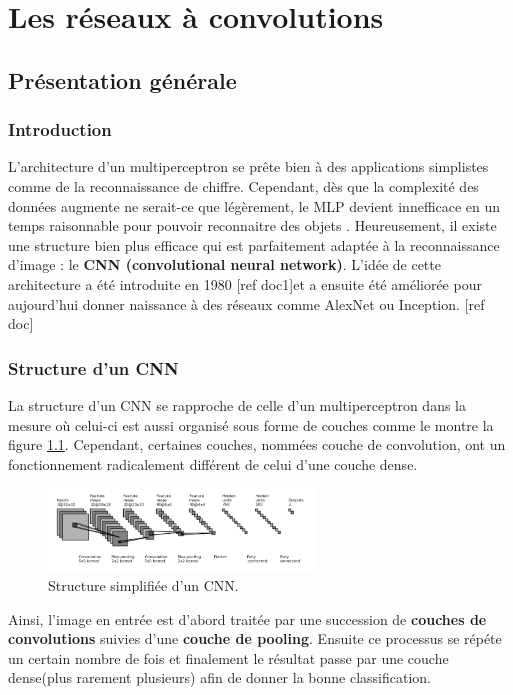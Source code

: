 

\chapter{Les réseaux à convolutions}


\section{Présentation générale}

\subsection{Introduction}
L'architecture d'un multiperceptron se prête bien à des applications simplistes comme de la reconnaissance de chiffre. Cependant, dès que la complexité des données augmente ne serait-ce que légèrement, le MLP devient innefficace en un temps raisonnable pour pouvoir reconnaitre des objets . Heureusement, il existe une structure bien plus efficace qui est parfaitement adaptée à la reconnaissance d'image : le \textbf{CNN (convolutional neural network)}. L'idée de cette architecture a été introduite en 1980 [ref doc1]et a ensuite été améliorée pour aujourd'hui donner naissance à des réseaux comme AlexNet ou Inception. [ref doc]

\subsection{Structure d'un CNN}
La structure d'un CNN se rapproche de celle d'un multiperceptron dans la mesure où celui-ci est aussi organisé sous forme de couches comme le montre la figure \ref{structure_1}. Cependant, certaines couches, nommées couche de convolution, ont un fonctionnement radicalement différent de celui d'une couche dense. \\

\begin{figure}[!h]
\centering
\includegraphics[width=200pt]{images/cnn/structure_CNN.png} 
\caption{Structure simplifiée d'un CNN.}
\label{structure_1}
\end{figure}

Ainsi, l'image en entrée est d'abord traitée par une succession de \textbf{couches de convolutions} suivies d'une \textbf{couche de pooling}. Ensuite ce processus se répéte un certain nombre de fois et finalement le résultat passe par une couche dense(plus rarement plusieurs) afin de donner la bonne classification.

